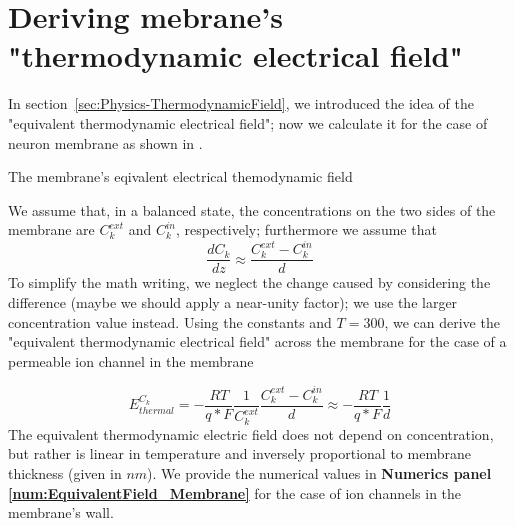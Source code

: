 \section[Thermodynamic field]{Deriving mebrane's "thermodynamic electrical field"\label{sec:Physics-ElectrolyteThermalField}}


In section~\ref{sec:Physics-ThermodynamicField}, we introduced the idea
of the "equivalent thermodynamic electrical field";
now we calculate it for the case of neuron membrane 
as shown in .

{The membrane's eqivalent electrical themodynamic field}
{
We assume that, in a balanced state, the concentrations on the two sides of the membrane are $C_{k}^{ext}$ and $C_{k}^{in}$, respectively; furthermore we assume that \[\frac{dC_{k}}{dz}\approx\frac{C_{k}^{ext}-C_{k}^{in}}{d}\]
To simplify the math writing, we neglect the change caused by considering 
the difference (maybe we should apply a near-unity factor); we use the larger concentration value instead. Using the constants and $T=300$, we can derive the "equivalent thermodynamic electrical field" across the membrane for the case of a permeable ion channel in the membrane

\begin{equation}
	E_{thermal}^{C_{k}}=-\frac{RT}{q*F}\frac{1}{C_{k}^{ext}}\frac{C_{k}^{ext}-C_{k}^{in}}{d} \approx -\frac{RT}{q*F}\frac{1}{d}
	\label{eq:NernstPlanckThermal1}
\end{equation}
\noindent
The equivalent thermodynamic electric field does not depend on concentration, but rather is linear in temperature and inversely proportional to membrane thickness (given in $nm$).
We provide the numerical values in \textbf{Numerics panel \ref{num:EquivalentField_Membrane}} for the case of ion channels in the membrane's wall.
}

